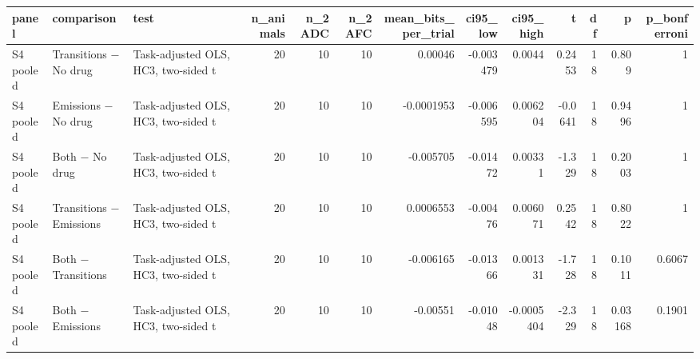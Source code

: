 \begin{tabular}{lllrrrrrrrrrr}
\toprule
panel & comparison & test & n\_animals & n\_2ADC & n\_2AFC & mean\_bits\_per\_trial & ci95\_low & ci95\_high & t & df & p & p\_bonferroni \\
\midrule
S4 pooled & Transitions − No drug & Task-adjusted OLS, HC3, two-sided t & 20 & 10 & 10 & 0.00046 & -0.003479 & 0.0044 & 0.2453 & 18 & 0.809 & 1 \\
S4 pooled & Emissions − No drug & Task-adjusted OLS, HC3, two-sided t & 20 & 10 & 10 & -0.0001953 & -0.006595 & 0.006204 & -0.0641 & 18 & 0.9496 & 1 \\
S4 pooled & Both − No drug & Task-adjusted OLS, HC3, two-sided t & 20 & 10 & 10 & -0.005705 & -0.01472 & 0.00331 & -1.329 & 18 & 0.2003 & 1 \\
S4 pooled & Transitions − Emissions & Task-adjusted OLS, HC3, two-sided t & 20 & 10 & 10 & 0.0006553 & -0.00476 & 0.006071 & 0.2542 & 18 & 0.8022 & 1 \\
S4 pooled & Both − Transitions & Task-adjusted OLS, HC3, two-sided t & 20 & 10 & 10 & -0.006165 & -0.01366 & 0.001331 & -1.728 & 18 & 0.1011 & 0.6067 \\
S4 pooled & Both − Emissions & Task-adjusted OLS, HC3, two-sided t & 20 & 10 & 10 & -0.00551 & -0.01048 & -0.0005404 & -2.329 & 18 & 0.03168 & 0.1901 \\
\bottomrule
\end{tabular}
